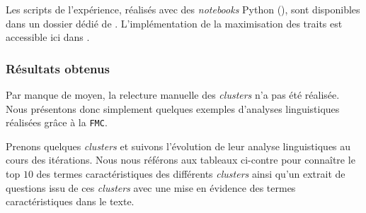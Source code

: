 			\begin{leftBarInformation}
				Les scripts de l'expérience, réalisés avec des \textit{notebooks} Python (\cite{van-rossum-drake:2009:python-reference-manual}), sont disponibles dans un dossier dédié de \cite{schild:2021:cognitivefactory-interactiveclusteringcomparativestudy}.
				L'implémentation de la maximisation des traits est accessible ici dans \cite{schild:2023:cognitivefactory-featuresmaximizationmetric}.
			\end{leftBarInformation}

		\subsubsection{Résultats obtenus}
			
			\begin{leftBarWarning}
				Par manque de moyen, la relecture manuelle des \textit{clusters} n'a pas été réalisée.
				Nous présentons donc simplement quelques exemples d'analyses linguistiques réalisées grâce à la \texttt{FMC}.
			\end{leftBarWarning}
			
			Prenons quelques \textit{clusters} et suivons l'évolution de leur analyse linguistiques au cours des itérations.
			Nous nous référons aux tableaux ci-contre pour connaître le top $10$ des termes caractéristiques des différents \textit{clusters} ainsi qu'un extrait de questions issu de ces \textit{clusters} avec une mise en évidence des termes caractéristiques dans le texte.
			
